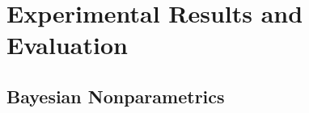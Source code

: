 \chapter{Experimental Results and Evaluation}
\blindtext

\section{Bayesian Nonparametrics}
\Blindtext
\Blindtext
\Blindtext